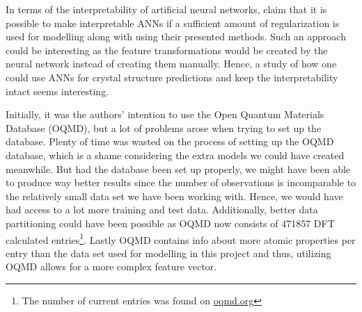 In terms of the interpretability of artificial neural networks, \citep{Intrator2001} claim that it is possible to make interpretable ANNs if a sufficient amount of regularization is used for modelling along with using their presented methods. Such an approach could be interesting as the feature transformations would be created by the neural network instead of creating them manually. Hence, a study of how one could use ANNs for crystal structure predictions and keep the interpretability intact seems interesting. 



Initially, it was the authors' intention to use the Open Quantum Materials Database (OQMD), but a lot of problems arose when trying to set up the database. Plenty of time was wasted on the process of setting up the OQMD database, which is a shame considering the extra models we could have created meanwhile. But had the database been set up properly, we might have been able to produce way better results since the number of observations is incomparable to the relatively small data set we have been working with. Hence, we would have had access to a lot more training and test data. Additionally, better data partitioning could have been possible as OQMD now consists of 471857 DFT calculated entries\footnote{The number of current entries was found on \url{oqmd.org}}. Lastly OQMD contains info about more atomic properties per entry than the data set used for modelling in this project and thus, utilizing OQMD allows for a more complex feature vector.
 
 \newpage
 
 
